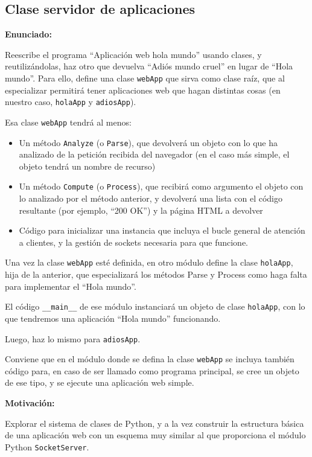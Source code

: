 \subsection{Clase servidor de aplicaciones}
\label{subsec:clase-serv-aplis}

\textbf{Enunciado:}

Reescribe el programa ``Aplicación web hola mundo'' usando clases, y reutilizándolas, haz otro que devuelva ``Adiós mundo cruel'' en lugar de ``Hola mundo''. Para ello, define una clase \texttt{webApp} que sirva como clase raíz, que al especializar permitirá tener aplicaciones web que hagan distintas cosas (en nuestro caso, \texttt{holaApp} y \texttt{adiosApp}).

Esa clase \texttt{webApp} tendrá al menos:

\begin{itemize}
\item Un método \texttt{Analyze} (o \texttt{Parse}), que devolverá un objeto con lo que ha analizado de la petición recibida del navegador (en el caso más simple, el objeto tendrá un nombre de recurso)
\item Un método \texttt{Compute} (o \texttt{Process}), que recibirá como argumento el objeto con lo analizado por el método anterior, y devolverá una lista con el código resultante (por ejemplo, ``200 OK'') y la página HTML a devolver
\item Código para inicializar una instancia que incluya el bucle general de atención a clientes, y la gestión de sockets necesaria para que funcione.
\end{itemize}

Una vez la clase \texttt{webApp} esté definida, en otro módulo define la clase \texttt{holaApp}, hija de la anterior, que especializará los métodos Parse y Process como haga falta para implementar el ``Hola mundo''.

El código \verb|__main__| de ese módulo instanciará un objeto de clase \texttt{holaApp}, con lo que tendremos una aplicación ``Hola mundo'' funcionando.

Luego, haz lo mismo para \texttt{adiosApp}.

Conviene que en el módulo donde se defina la clase \texttt{webApp} se incluya también código para, en caso de ser llamado como programa principal, se cree un objeto de ese tipo, y se ejecute una aplicación web simple.

\textbf{Motivación:}

Explorar el sistema de clases de Python, y a la vez construir la estructura básica de una aplicación web con un esquema muy similar al que proporciona el módulo Python \texttt{SocketServer}.

